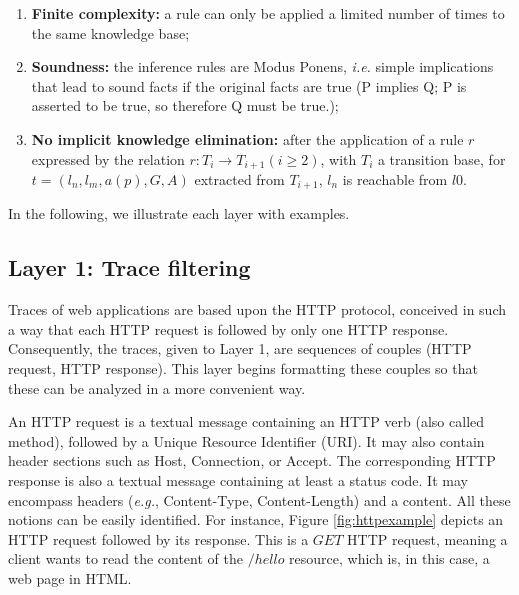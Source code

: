 \begin{enumerate}
    \item \textbf{Finite complexity:} a rule can only be applied
        a limited number of times to the same knowledge base;

    \item \textbf{Soundness:} the inference rules are Modus
        Ponens, \emph{i.e.} simple implications that lead to
        sound facts if the original facts are true (P implies Q;
        P is asserted to be true, so therefore Q must be true.);

    \item \textbf{No implicit knowledge elimination:} after the
        application of a rule $r$ expressed by the relation $r:
        T_i \rightarrow T_{i+1} (i\geq 2)$, with $T_i$ a
        transition base, for $t=(l_n,l_m,a(p),G,A)$ extracted
        from $T_{i+1}$, $l_n$ is reachable from $l0$.
\end{enumerate}

In the following, we illustrate each layer with examples.

\subsection{Layer 1: Trace filtering}
\label{sec:modelinf:webapps:L1}

Traces of web applications are based upon the HTTP protocol,
conceived in such a way that each HTTP request is followed by
only one HTTP response. Consequently, the traces, given to Layer
1, are sequences of couples (HTTP request, HTTP response). This
layer begins formatting these couples so that these can be
analyzed in a more convenient way.

An HTTP request is a textual message containing an HTTP verb
(also called method), followed by a Unique Resource Identifier
(URI). It may also contain header sections such as Host,
Connection, or Accept. The corresponding HTTP response is also a
textual message containing at least a status code. It may
encompass headers (\emph{e.g.},  Content-Type, Content-Length) and a
content. All these notions can be easily identified. For
instance, Figure \ref{fig:httpexample} depicts an HTTP request
followed by its response. This is a $GET$ HTTP request, meaning a
client wants to read the content of the $/hello$ resource, which
is, in this case, a web page in HTML.

